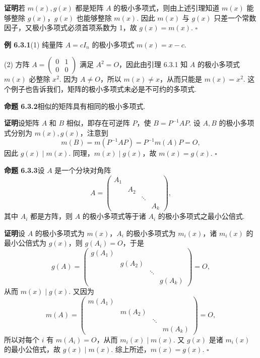 \documentclass[UTF8, 12pt, fontset=fandol, oneside]{ctexart}
\begin{document}
\noindent\textbf{证明}\quad 若 $m(x),g(x)$ 都是矩阵 $A$ 的极小多项式，则由上述引理知道 $m(x)$ 能够整除 $g(x)$，$g(x)$ 也能够整除 $m(x)$. 因此 $m(x)$ 与 $g(x)$ 只差一个常数因子，又极小多项式必须首项系数为 1，故 $g(x)=m(x)$. $\square$

\noindent\textbf{例 6.3.1}\quad (1) 纯量阵 $A=cI_n$ 的极小多项式 $m(x)=x-c$.

(2) 方阵 $A=\left(\begin{array}{cc}0&1\\0&0\end{array}\right)$ 满足 $A^2=O$，因此由引理 6.3.1 知 $A$ 的极小多项式 $m(x)$ 必整除 $x^2$. 因为 $A\neq O$，所以 $m(x)\neq x$，从而只能是 $m(x)=x^2$. 这个例子也告诉我们，矩阵的极小多项式未必是不可约的多项式.

\noindent\textbf{命题 6.3.2}\quad 相似的矩阵具有相同的极小多项式.

\noindent\textbf{证明}\quad 设矩阵 $A$ 和 $B$ 相似，即存在可逆阵 $P$，使 $B=P^{-1}AP$. 设 $A,B$ 的极小多项式分别为 $m(x),g(x)$，注意到
\[
m(B)=m(P^{-1}AP)=P^{-1}m(A)P=O,
\]
因此 $g(x)\mid m(x)$. 同理，$m(x)\mid g(x)$，故 $m(x)=g(x)$. $\square$

\noindent\textbf{命题 6.3.3}\quad 设 $A$ 是一个分块对角阵
\[
A=\left(\begin{array}{cccc}
A_1 & & & \\
& A_2 & & \\
& & \ddots & \\
& & & A_k
\end{array}\right),
\]
其中 $A_i$ 都是方阵，则 $A$ 的极小多项式等于诸 $A_i$ 的极小多项式之最小公倍式.

\noindent\textbf{证明}\quad 设 $A$ 的极小多项式为 $m(x)$，$A_i$ 的极小多项式为 $m_i(x)$，诸 $m_i(x)$ 的最小公倍式为 $g(x)$，则 $g(A_i)=O$，于是
\[
g(A)=\left(\begin{array}{cccc}
g(A_1) & & & \\
& g(A_2) & & \\
& & \ddots & \\
& & & g(A_k)
\end{array}\right)=O,
\]
从而 $m(x)\mid g(x)$. 又因为
\[
m(A)=\left(\begin{array}{cccc}
m(A_1) & & & \\
& m(A_2) & & \\
& & \ddots & \\
& & & m(A_k)
\end{array}\right)=O,
\]
所以对每个 $i$ 有 $m(A_i)=O$，从而 $m_i(x)\mid m(x)$. 又 $g(x)$ 是诸 $m_i(x)$ 的最小公倍式，故 $g(x)\mid m(x)$. 综上所述，$m(x)=g(x)$. $\square$
\end{document}
